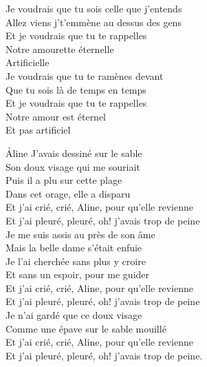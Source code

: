 \documentclass{novel}
\begin{document}
Je voudrais que tu sois celle que j'entends \\
Allez viens j't'emmène au dessus des gens \\
Et je voudrais que tu te rappelles \\
Notre amourette éternelle \\
Artificielle \\

Je voudrais que tu te ramènes devant \\
Que tu sois là de temps en temps \\
Et je voudrais que tu te rappelles \\
Notre amour est éternel \\
Et pas artificiel 

\newpage
\normalsize
\h*{Aline}
J'avais dessiné sur le sable \\
Son doux visage qui me souriait \\
Puis il a plu sur cette plage \\
Dans cet orage, elle a disparu \\

Et j'ai crié, crié, Aline, pour qu'elle revienne \\
Et j'ai pleuré, pleuré, oh! j'avais trop de peine \\

Je me suis assis au près de son âme \\
Mais la belle dame s'était enfuie \\
Je l'ai cherchée sans plus y croire \\
Et sans un espoir, pour me guider \\

Et j'ai crié, crié, Aline, pour qu'elle revienne \\
Et j'ai pleuré, pleuré, oh! j'avais trop de peine \\

Je n'ai gardé que ce doux visage \\
Comme une épave sur le sable mouillé \\

Et j'ai crié, crié, Aline, pour qu'elle revienne \\
Et j'ai pleuré, pleuré, oh! j'avais trop de peine.
\end{document}
